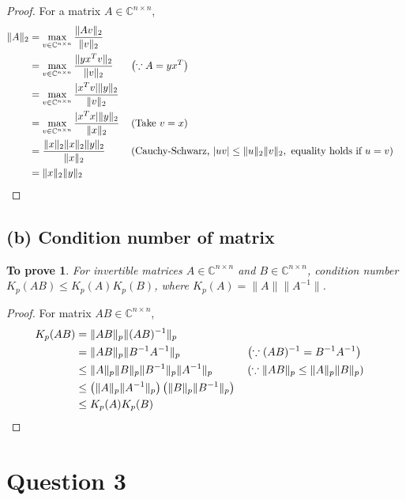 \documentclass[11pt, oneside]{article}
\newtheorem*{remark}{To prove}
\begin{document}
  	\begin{proof} For a matrix $A \in  \mathbb{C}^{n \times n}$,
    		\begin{align}
    			\|A\|_2 &= \max_{v \in \mathbb{C}^{n \times n}} \frac{\|Av\|_2}{\|v\|_2} \\
				&= \max_{v \in \mathbb{C}^{n \times n}} \frac{\|yx^Tv\|_2}{\|v\|_2} && \left(\because A = yx^T \right) \\
				&= \max_{v \in \mathbb{C}^{n \times n}} \frac{|x^Tv|\|y\|_2}{\|v\|_2} \\
				&= \max_{v \in \mathbb{C}^{n \times n}} \frac{|x^Tx|\|y\|_2}{\|x\|_2} && \left(\text{Take } v = x\right) \\
				&= \frac{\|x\|_2\|x\|_2 \|y\|_2}{\|x\|_2} && \left(\text{Cauchy-Schwarz, } |uv| \leq \|u\|_2\|v\|_2, \text{ equality holds if } u=v \right) \\
				&= \|x\|_2 \|y\|_2 && \qedhere
    		\end{align}
  	\end{proof}
  
\subsection*{(b) Condition number of matrix}
  	\begin{remark}
    		For invertible matrices $A \in \mathbb{C}^{n \times n}$ and $B \in \mathbb{C}^{n \times n}$, condition number $K_p(AB) \leq K_p(A) K_p(B)$, where $K_p(A) = \|A\| \|A^{-1}\|$. 
  	\end{remark}
	
  	\begin{proof} For matrix $AB \in  \mathbb{C}^{n \times n}$,
    		\begin{align}
    			K_p(AB) &= \|AB\|_p \|(AB)^{-1}\|_p \\
					&= \|AB\|_p \|B^{-1}A^{-1}\|_p && \left(\because (AB)^{-1} = B^{-1} A^{-1}\right)\\
					&\leq \|A\|_p \|B\|_p  \|B^{-1}\|_p  \|A^{-1}\|_p && \left(\because \|AB\|_p \leq  \|A\|_p \|B\|_p\right)\\
					&\leq  \left(\|A\|_p \|A^{-1}\|_p \right) \left(\|B\|_p  \|B^{-1}\|_p\right) \\
					&\leq K_p(A) K_p(B) && \qedhere
    		\end{align}
  	\end{proof}
  
\section*{Question 3}
\end{document}
